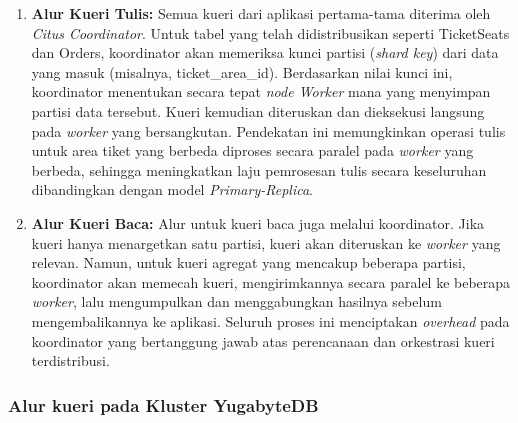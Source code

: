 \begin{enumerate}
    \item \textbf{Alur Kueri Tulis:} Semua kueri dari aplikasi pertama-tama diterima oleh \textit{Citus Coordinator}. Untuk tabel yang telah didistribusikan seperti TicketSeats dan Orders, koordinator akan memeriksa kunci partisi (\textit{shard key}) dari data yang masuk (misalnya, ticket\_area\_id). Berdasarkan nilai kunci ini, koordinator menentukan secara tepat \textit{node Worker} mana yang menyimpan partisi data tersebut. Kueri kemudian diteruskan dan dieksekusi langsung pada \textit{worker} yang bersangkutan. Pendekatan ini memungkinkan operasi tulis untuk area tiket yang berbeda diproses secara paralel pada \textit{worker} yang berbeda, sehingga meningkatkan laju pemrosesan tulis secara keseluruhan dibandingkan dengan model \textit{Primary-Replica}.
    \item \textbf{Alur Kueri Baca:} Alur untuk kueri baca juga melalui koordinator. Jika kueri hanya menargetkan satu partisi, kueri akan diteruskan ke \textit{worker} yang relevan. Namun, untuk kueri agregat yang mencakup beberapa partisi, koordinator akan memecah kueri, mengirimkannya secara paralel ke beberapa \textit{worker}, lalu mengumpulkan dan menggabungkan hasilnya sebelum mengembalikannya ke aplikasi. Seluruh proses ini menciptakan \textit{overhead} pada koordinator yang bertanggung jawab atas perencanaan dan orkestrasi kueri terdistribusi.
\end{enumerate}

\subsubsection{Alur kueri pada Kluster YugabyteDB}

